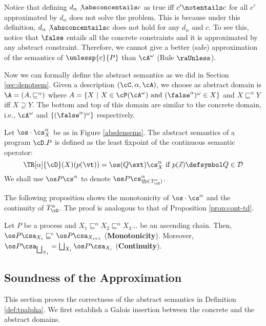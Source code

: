 \documentclass{tlp}
\begin{document}
Notice that defining $d_\alpha \not\absconcentails c$ as true iff  $c' \notentails c$
for  all $c'$ approximated by  $d_\alpha $   does not solve the problem. This is  because 
under this definition,   $d_\alpha \not\absconcentails c$ does not hold 
for any $d_\alpha$ and $c$. To see this, notice that  
$\false$ entails all the concrete constraints 
and it is approximated by any abstract constraint.
Therefore,  we cannot give a better (safe) approximation of the semantics of  $\unlessp{c}{P}$ than $\cA^\omega$ (Rule $\raUnless$).




Now we can formally define the abstract semantics as we did in Section \ref{sec:denotsem}. Given a description $(\cC,\alpha, \cA)$, we choose as  abstract domain is $\A = (A, \sqsubseteq^\alpha)$ where 
$A=\{ X \ | \ X \in \cP(\cA^\omega) \mbox { and } (\false^\alpha)^\omega \in X \}$  and $X\sqsubseteq^\alpha Y$ iff $X \supseteq Y$. 
The bottom and top of this domain are similar to the concrete domain, i.e.,  $\cA^\omega$ and $\{(\false^\alpha)^\omega\}$ respectively.



\begin{definition}\label{def:tpalpha}  Let  $\os \cdot \cs^{\alpha}_{X} $ be  as in Figure \ref{absdensems}. The abstract semantics of a program $\cD.P$ is defined as the 
least fixpoint of the  continuous  semantic operator:
\[
		\TR[\alpha]{\cD}(X)(p(\vt)) = 
		{\os (Q\sxt) \cs^{\alpha}_{X}}
		\mbox{ if } p(\vec{x}) \defsymbol Q \in 
		\mathcal{D}
\]
We shall use $\os P \cs^\alpha $ to denote $\os P \cs^\alpha_{\it lfp(T_{\cD}^{\alpha})}$.
\end{definition} 

The following proposition shows the monotonicity of $\os \cdot \cs^\alpha$ and 
the continuity of $T_{\cD}^\alpha$. The proof is analogous to that of Proposition  \ref{prop:cont-td}.

\begin{proposition}
Let $P$ be a process and  $X_1 \sqsubseteq^{\alpha} X_2 \sqsubseteq^{\alpha} X_3 ...$ be an ascending chain. Then, 
$\os P \csa_{X_i} \sqsubseteq^c \os P \csa_{X_{i+1}} $ ({\bf Monotonicity}). Moreover,  $\os P \csa_{\bigsqcup_ {X_i}} =  \bigsqcup_ {X_i} \os P \csa_{X_i} $ ({\bf Continuity}). 
\end{proposition}



\subsection{Soundness of the Approximation}
This section proves the correctness of the abstract semantics in Definition \ref{def:tpalpha}. We first establish a Galois insertion between the concrete and the abstract domains. 
\end{document}
